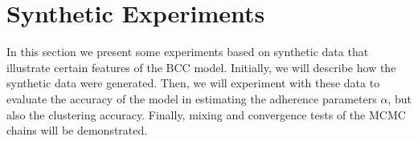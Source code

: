 \section{Synthetic Experiments} \label{integr-synth-exper-sect}
In this section we present some experiments based on synthetic data that illustrate certain features of the BCC model. Initially, we will describe how the synthetic data were generated. Then, we will experiment with these data to evaluate the accuracy of the model in estimating the adherence parameters $\alpha$, but also the clustering accuracy. Finally, mixing and convergence tests of the MCMC chains will be demonstrated.



